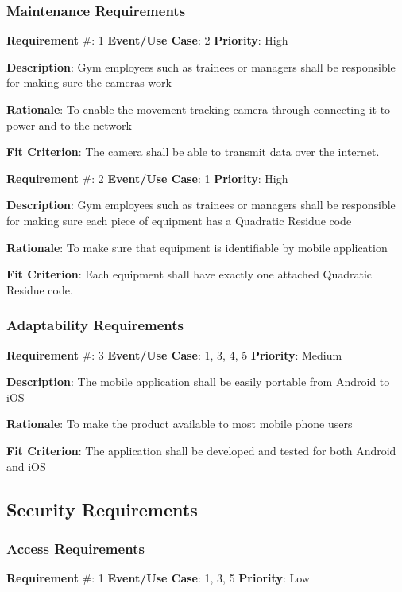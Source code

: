 \documentclass{article}
\newcommand\tab{\hspace*{2cm}}
\begin{document}
\subsubsection{Maintenance Requirements}
\textbf{Requirement} \#: 1 \tab \textbf{Event/Use Case}: 2 \tab \textbf{Priority}: High

\textbf{Description}: Gym employees such as trainees or managers shall be responsible for making sure the cameras work

\textbf{Rationale}: To enable the movement-tracking camera through connecting it to power and to the network

\textbf{Fit Criterion}: The camera shall be able to transmit data over the internet.

\medskip

\textbf{Requirement} \#: 2 \tab \textbf{Event/Use Case}: 1 \tab \textbf{Priority}: High

\textbf{Description}: Gym employees such as trainees or managers shall be responsible for making sure each piece of equipment has a Quadratic Residue code

\textbf{Rationale}: To make sure that equipment is identifiable by mobile application

\textbf{Fit Criterion}: Each equipment shall have exactly one attached Quadratic Residue code.

\medskip

\subsubsection{Adaptability Requirements}

\textbf{Requirement} \#: 3 \tab \textbf{Event/Use Case}: 1, 3, 4, 5 \tab \textbf{Priority}: Medium

\textbf{Description}: The mobile application shall be easily portable from Android to iOS

\textbf{Rationale}: To make the product available to most mobile phone users

\textbf{Fit Criterion}: The application shall be developed and tested for both Android and iOS

\medskip

\subsection{Security Requirements}
\subsubsection{Access Requirements}
\textbf{Requirement} \#: 1 \tab \textbf{Event/Use Case}: 1, 3, 5 \tab \textbf{Priority}: Low
\end{document}
